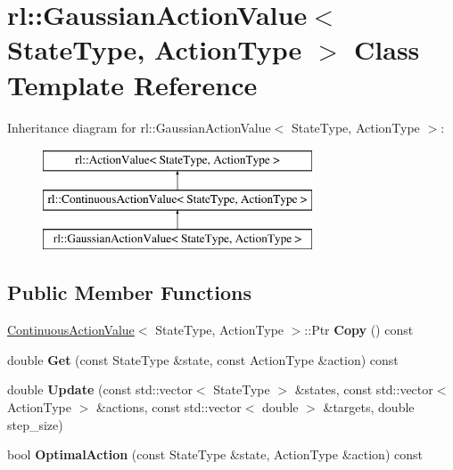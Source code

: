\hypertarget{classrl_1_1_gaussian_action_value}{}\section{rl\+:\+:Gaussian\+Action\+Value$<$ State\+Type, Action\+Type $>$ Class Template Reference}
\label{classrl_1_1_gaussian_action_value}
Inheritance diagram for rl\+:\+:Gaussian\+Action\+Value$<$ State\+Type, Action\+Type $>$\+:\begin{figure}[H]
\begin{center}
\leavevmode
\includegraphics[height=3.000000cm]{classrl_1_1_gaussian_action_value}
\end{center}
\end{figure}
\subsection*{Public Member Functions}
\begin{DoxyCompactItemize}
\item 
\hypertarget{classrl_1_1_gaussian_action_value_a1975a9aa90de6525a3fb9ba12d18c88c}{}\label{classrl_1_1_gaussian_action_value_a1975a9aa90de6525a3fb9ba12d18c88c} 
\hyperlink{classrl_1_1_continuous_action_value}{Continuous\+Action\+Value}$<$ State\+Type, Action\+Type $>$\+::Ptr {\bfseries Copy} () const
\item 
\hypertarget{classrl_1_1_gaussian_action_value_a734ababf1ad7cf03af541670eb908aa4}{}\label{classrl_1_1_gaussian_action_value_a734ababf1ad7cf03af541670eb908aa4} 
double {\bfseries Get} (const State\+Type \&state, const Action\+Type \&action) const
\item 
\hypertarget{classrl_1_1_gaussian_action_value_aa0b929767d439c691131c08ed9990f14}{}\label{classrl_1_1_gaussian_action_value_aa0b929767d439c691131c08ed9990f14} 
double {\bfseries Update} (const std\+::vector$<$ State\+Type $>$ \&states, const std\+::vector$<$ Action\+Type $>$ \&actions, const std\+::vector$<$ double $>$ \&targets, double step\+\_\+size)
\item 
\hypertarget{classrl_1_1_gaussian_action_value_ae8f9d0b42b050f72409a378039d005da}{}\label{classrl_1_1_gaussian_action_value_ae8f9d0b42b050f72409a378039d005da} 
bool {\bfseries Optimal\+Action} (const State\+Type \&state, Action\+Type \&action) const
\end{DoxyCompactItemize}

